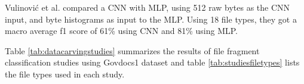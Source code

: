 Vulinović et al. \cite{vulinovic_neural_2019}
compared a CNN with MLP, using 512 raw bytes as the CNN input, and byte histograms as input to the MLP.
Using 18 file types, they got a macro average f1 score of 61\% using CNN and 81\% using MLP.

Table \ref{tab:datacarvingstudies} summarizes 
the results of file fragment classification studies using Govdocs1 dataset and table \ref{tab:studiesfiletypes}
lists the file types used in each study.

\begin{table*}[!ht]
\caption{\label{tab:datacarvingstudies}File fragment classification studies using the Govdocs1 dataset}
\end{table*}

